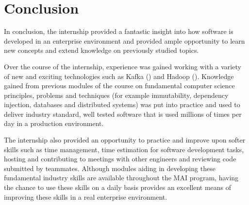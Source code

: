 \chapter{Conclusion}
In conclusion, the internship provided a fantastic insight into how software is developed in an enterprise environment and provided ample opportunity to learn new concepts and extend knowledge on previously studied topics. 

Over the course of the internship, experience was gained working with a variety of new and exciting technologies such as Kafka () and Hadoop (). Knowledge gained from previous modules of the course on fundamental computer science principles, problems and techniques (for example immutability, dependency injection, databases and distributed systems) was put into practice and used to deliver industry standard, well tested software that is used millions of times per day in a production environment.

The internship also provided an opportunity to practice and improve upon softer skills such as time management, time estimation for software development tasks, hosting and contributing to meetings with other engineers and reviewing code submitted by teammates. Although modules aiding in developing these fundamental industry skills are available throughout the MAI program, having the chance to use these skills on a daily basis provides an excellent means of improving these skills in a real enterprise environment.
